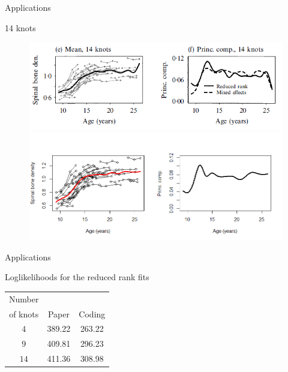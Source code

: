 \documentclass{beamer}
\begin{document}
\begin{frame}{Applications}
	\begin{block}{14 knots}
		\begin{figure}[h] %
			\begin{center}
				\includegraphics[width=0.8\linewidth]{img/14knots_true.png}
				\includegraphics[width=0.8\linewidth]{img/14knots.png}
			\end{center}
			\label{fig:long}
			\label{fig:onecol}
		\end{figure}
	\end{block}
\end{frame}

\begin{frame}{Applications}
	\begin{block}{Loglikelihoods for the reduced rank fits}
		\begin{table}[ht]
			\centering
			\begin{tabular}{ccc}
				\hline
				Number \\of knots& Paper & Coding \\ 
				\hline
				$4$ & 389.22 & 263.22 \\ 
				$9$ & 409.81 & 296.23 \\ 
				$14$ & 411.36 & 308.98 \\ 
				\hline
			\end{tabular}
		\end{table}
	\end{block}
\end{frame}
\end{document}
